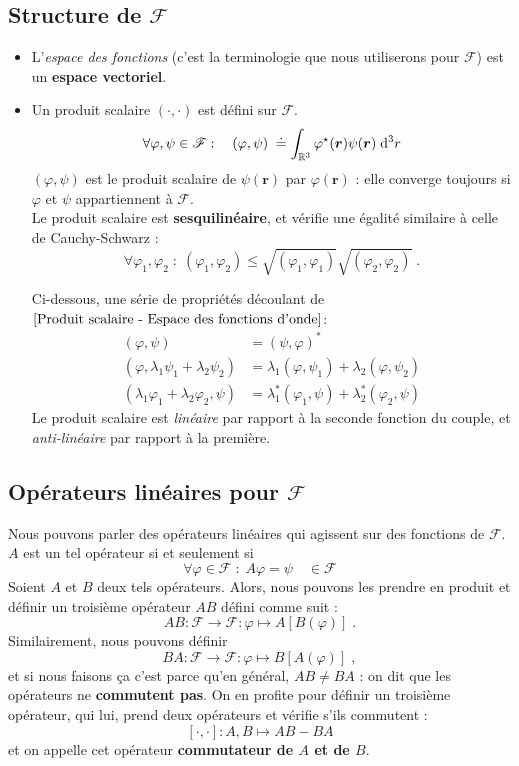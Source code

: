 \documentclass[../notesdecours.tex]{subfiles}
\begin{document}
\subsection{Structure de $\mathcal{F}$}
\begin{itemize}
\item L'\textit{espace des fonctions} (c'est la terminologie que nous utiliserons pour $\mathcal F$) est un \textbf{espace vectoriel}. \\
\item Un produit scalaire $(\cdot, \cdot)$ est défini sur $\mathcal F$.
\begin{equation}
\forall \varphi, \psi \in \mathcal F : \quad (\varphi, \psi)\;   \doteq \int_{\mathbb R ^3} \varphi ^\star(\bm{r}) \psi(\bm{r}) \; \mathrm{d} ^3 r
\label{Produit scalaire - Espace des fonctions d'onde}
\end{equation}
$(\varphi,\psi)$ est le produit scalaire de $\psi(\bm{r})$ par $\varphi(\bm{r})$ : elle converge toujours si $\varphi$ et $\psi$ appartiennent à $\mathcal{F}$.\\

Le produit scalaire est \textbf{sesquilinéaire}, et vérifie une égalité similaire à celle de Cauchy-Schwarz : 
$$ \forall \varphi_1, \varphi_2 \; : \; (\varphi_1, \varphi_2) \leq \sqrt{(\varphi_1, \varphi_1)}\sqrt{(\varphi_2, \varphi_2)} \; .$$

Ci-dessous, une série de propriétés découlant de $\ref{Produit scalaire - Espace des fonctions d'onde}$:
\begin{align*}
(\varphi,\psi) &= (\psi,\varphi)^*\\
(\varphi,\lambda_1\psi_1 + \lambda_2\psi_2) &= \lambda_1 (\varphi,\psi_1) + \lambda_2 (\varphi,\psi_2)\\
(\lambda_1\varphi_1 + \lambda_2\varphi_2,\psi) &= \lambda_1^* (\varphi_1,\psi) + \lambda_2^* (\varphi_2,\psi)
\end{align*}
Le produit scalaire est \emph{linéaire} par rapport à la seconde fonction du couple, et \emph{anti-linéaire} par rapport à la première.
\end{itemize}

\subsection{Opérateurs linéaires pour $\mathcal F$}
Nous pouvons parler des opérateurs linéaires qui agissent sur des fonctions de $\mathcal F$. $A$ est un tel opérateur si et seulement si $$\forall \varphi \in \mathcal F \; : \; A\varphi = \psi \quad \in 
\mathcal F$$
Soient $A$ et $B$ deux tels opérateurs. Alors, nous pouvons les prendre en produit et définir un troisième opérateur $AB$ défini comme suit :
$$AB : \mathcal F \rightarrow \mathcal F : \varphi \longmapsto A[B(\varphi)]\; .$$
Similairement, nous pouvons définir
$$BA : \mathcal F \rightarrow \mathcal F : \varphi \longmapsto B[A(\varphi)]\; ,$$
et si nous faisons ça c'est parce qu'en général, $AB \neq BA$ : on dit que les opérateurs ne \textbf{commutent pas}. On en profite pour définir un troisième opérateur, qui lui, prend deux opérateurs et vérifie s'ils commutent :
$$[\cdot, \cdot] : A, B \longmapsto AB-BA$$
et on appelle cet opérateur \textbf{commutateur de $A$ et de $B$}.
\end{document}

